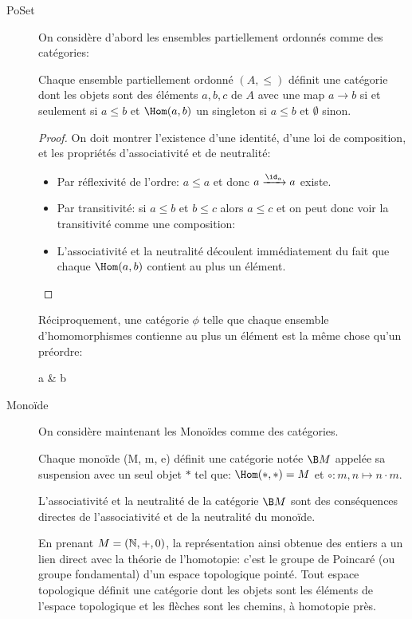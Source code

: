 \documentclass[math]{cours}
\begin{document}
\begin{exemple}
	\begin{description}
	\item[PoSet] On considère d'abord les ensembles partiellement ordonnés comme des catégories:
		\begin{proposition}
	Chaque ensemble partiellement ordonné $(A, \leq)$ définit une catégorie dont les objets sont des éléments $a, b, c$ de $A$
		avec une map $a\to b$ si et seulement si $a \leq b$ et $\Hom(a, b)$ un singleton si $a\leq b$ et $\emptyset$ sinon.
	\label{prop:posetcat}
	\end{proposition}
\begin{proof}
	On doit montrer l'existence d'une identité, d'une loi de composition, et les propriétés d'associativité et de neutralité:
		\begin{itemize}
				\item Par réflexivité de l'ordre: $a \leq a$ et donc $a \xrightarrow{\id_{a}} a$ existe.
					\item Par transitivité: si $a \leq b$ et $b \leq c$ alors $a\leq c$ et on peut donc voir la transitivité comme une composition:
						\item L'associativité et la neutralité découlent immédiatement du fait que chaque $\Hom(a, b)$ contient au plus un élément.
						\end{itemize}
			\end{proof}

	Réciproquement, une catégorie $\phi$ telle que chaque ensemble d'homomorphismes contienne au plus un élément est la même chose qu'un préordre:
\begin{category}[]
	a  &
		b 
\end{category}

	\item[Monoïde] On considère maintenant les Monoïdes comme des catégories.
\begin{proposition}
	Chaque monoïde (M, m, e) définit une catégorie notée $\B M$ appelée sa suspension avec un seul objet $*$ tel que:
		$\Hom(*, *) = M$ et $\circ: m, n \mapsto n\cdot m$.
	\label{prop:moncat}
	\end{proposition}
	L'associativité et la neutralité de la catégorie $\B M$ sont des conséquences directes de l'associativité et de la neutralité du monoïde.

	\begin{remarque}
En prenant $M = \left(\mathbb{N}, +, 0\right)$, la représentation ainsi obtenue des entiers a un lien direct avec la théorie de l'homotopie: c'est le groupe de Poincaré (ou groupe fondamental) d'un espace topologique pointé.
Tout espace topologique définit une catégorie dont les objets sont les éléments de l'espace topologique et les flèches sont les chemins, à homotopie près.
\end{remarque}


\end{description}
\end{exemple}
\end{document}
